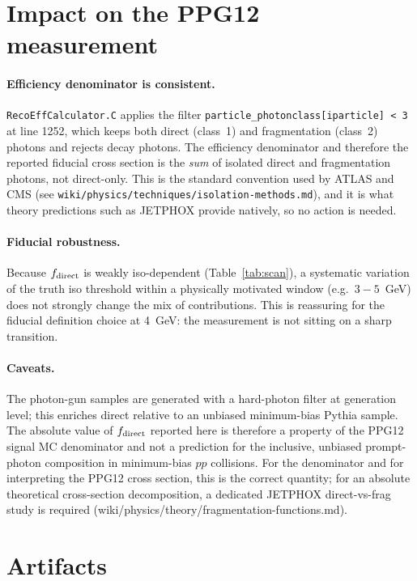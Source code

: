 \documentclass[11pt,a4paper]{article}
\begin{document}
\section{Impact on the PPG12 measurement}
\label{sec:impact}

\paragraph{Efficiency denominator is consistent.}  \texttt{RecoEffCalculator.C} applies the filter \texttt{particle\_photonclass[iparticle]\ < 3} at line 1252, which keeps both direct (class~1) and fragmentation (class~2) photons and rejects decay photons.  The efficiency denominator and therefore the reported fiducial cross section is the \emph{sum} of isolated direct and fragmentation photons, not direct-only.  This is the standard convention used by ATLAS and CMS (see \texttt{wiki/physics/techniques/isolation-methods.md}), and it is what theory predictions such as JETPHOX provide natively, so no action is needed.

\paragraph{Fiducial robustness.}  Because $f_{\rm direct}$ is weakly iso-dependent (Table~\ref{tab:scan}), a systematic variation of the truth iso threshold within a physically motivated window (e.g.\ $3{-}5$~GeV) does not strongly change the mix of contributions.  This is reassuring for the fiducial definition choice at 4~GeV: the measurement is not sitting on a sharp transition.

\paragraph{Caveats.}  The photon-gun samples are generated with a hard-photon filter at generation level; this enriches direct relative to an unbiased minimum-bias Pythia sample.  The absolute value of $f_{\rm direct}$ reported here is therefore a property of the PPG12 signal MC denominator and not a prediction for the inclusive, unbiased prompt-photon composition in minimum-bias $pp$ collisions.  For the denominator and for interpreting the PPG12 cross section, this is the correct quantity; for an absolute theoretical cross-section decomposition, a dedicated JETPHOX direct-vs-frag study is required (wiki/physics/theory/fragmentation-functions.md).

\section{Artifacts}
\label{sec:artifacts}
\end{document}
